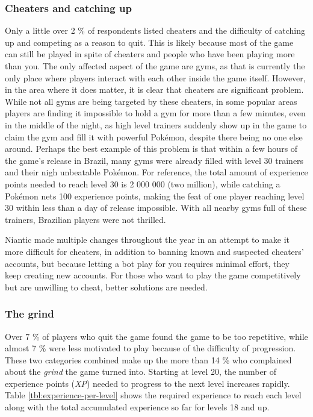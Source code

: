 \subsubsection{Cheaters and catching up}
\label{sec:cheaters-analysis}
Only a little over 2 \% of respondents listed cheaters and the difficulty of catching up and competing as a reason to quit. This is likely because most of the game can still be played in spite of cheaters and people who have been playing more than you. The only affected aspect of the game are gyms, as that is currently the only place where players interact with each other inside the game itself. However, in the area where it does matter, it is clear that cheaters are significant problem. While not all gyms are being targeted by these cheaters, in some popular areas players are finding it impossible to hold a gym for more than a few minutes, even in the middle of the night, as high level trainers suddenly show up in the game to claim the gym and fill it with powerful Pokémon, despite there being no one else around. Perhaps the best example of this problem is that within a few hours of the game's release in Brazil, many gyms were already filled with level 30 trainers and their nigh unbeatable Pokémon. For reference, the total amount of experience points needed to reach level 30 is 2 000 000 (two million), while catching a Pokémon nets 100 experience points, making the feat of one player reaching level 30 within less than a day of release impossible.  With all nearby gyms full of these trainers, Brazilian players were not thrilled.

Niantic made multiple changes throughout the year in an attempt to make it more difficult for cheaters, in addition to banning known and suspected cheaters' accounts, but because letting a bot play for you requires minimal effort, they keep creating new accounts. For those who want to play the game competitively but are unwilling to cheat, better solutions are needed. 

\subsubsection{The grind}
Over 7 \% of players who quit the game found the game to be too repetitive, while almost 7 \% were less motivated to play because of the difficulty of progression. These two categories combined make up the more than 14 \% who complained about the \emph{grind}  the game turned into. Starting at level 20, the number of experience points (\emph{XP}) needed to progress to the next level increases rapidly. Table \ref{tbl:experience-per-level} shows the required experience to reach each level along with the total accumulated experience so far for levels 18 and up. 

